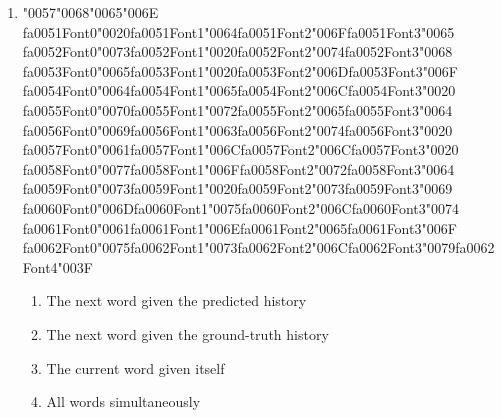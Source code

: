 \documentclass[12pt]{article}
\begin{document}
\begin{enumerate}[label=Q\arabic*.]
\item {\char"0057}{\char"0068}{\char"0065}{\char"006E} {\csname fa0051Font0\endcsname\char"0020}{\csname fa0051Font1\endcsname\char"0064}{\csname fa0051Font2\endcsname\char"006F}{\csname fa0051Font3\endcsname\char"0065} {\csname fa0052Font0\endcsname\char"0073}{\csname fa0052Font1\endcsname\char"0020}{\csname fa0052Font2\endcsname\char"0074}{\csname fa0052Font3\endcsname\char"0068} {\csname fa0053Font0\endcsname\char"0065}{\csname fa0053Font1\endcsname\char"0020}{\csname fa0053Font2\endcsname\char"006D}{\csname fa0053Font3\endcsname\char"006F} {\csname fa0054Font0\endcsname\char"0064}{\csname fa0054Font1\endcsname\char"0065}{\csname fa0054Font2\endcsname\char"006C}{\csname fa0054Font3\endcsname\char"0020} {\csname fa0055Font0\endcsname\char"0070}{\csname fa0055Font1\endcsname\char"0072}{\csname fa0055Font2\endcsname\char"0065}{\csname fa0055Font3\endcsname\char"0064} {\csname fa0056Font0\endcsname\char"0069}{\csname fa0056Font1\endcsname\char"0063}{\csname fa0056Font2\endcsname\char"0074}{\csname fa0056Font3\endcsname\char"0020} {\csname fa0057Font0\endcsname\char"0061}{\csname fa0057Font1\endcsname\char"006C}{\csname fa0057Font2\endcsname\char"006C}{\csname fa0057Font3\endcsname\char"0020} {\csname fa0058Font0\endcsname\char"0077}{\csname fa0058Font1\endcsname\char"006F}{\csname fa0058Font2\endcsname\char"0072}{\csname fa0058Font3\endcsname\char"0064} {\csname fa0059Font0\endcsname\char"0073}{\csname fa0059Font1\endcsname\char"0020}{\csname fa0059Font2\endcsname\char"0073}{\csname fa0059Font3\endcsname\char"0069} {\csname fa0060Font0\endcsname\char"006D}{\csname fa0060Font1\endcsname\char"0075}{\csname fa0060Font2\endcsname\char"006C}{\csname fa0060Font3\endcsname\char"0074} {\csname fa0061Font0\endcsname\char"0061}{\csname fa0061Font1\endcsname\char"006E}{\csname fa0061Font2\endcsname\char"0065}{\csname fa0061Font3\endcsname\char"006F} {\csname fa0062Font0\endcsname\char"0075}{\csname fa0062Font1\endcsname\char"0073}{\csname fa0062Font2\endcsname\char"006C}{\csname fa0062Font3\endcsname\char"0079}{\csname fa0062Font4\endcsname\char"003F}
\begin{enumerate}[label=(\Alph*)]
    \item The next word given the predicted history
    \item The next word given the ground-truth history
    \item The current word given itself
    \item All words simultaneously
\end{enumerate}

\end{enumerate}
\end{document}
